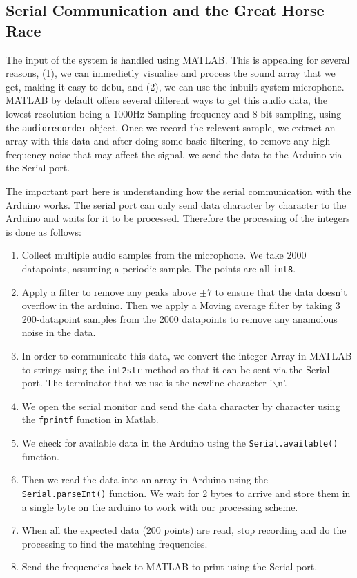 \subsection{Serial Communication and the Great Horse Race}
The input of the system is handled using MATLAB. This is appealing for several
reasons, (1), we can immedietly visualise and process the sound array that we
get, making it easy to debu, and (2), we can use the inbuilt system microphone.
MATLAB by default offers several different ways to get this audio data, the
lowest resolution being a 1000Hz Sampling frequency and 8-bit sampling, using
the \texttt{audiorecorder} object. Once we record the relevent sample, we
extract an array with this data and after doing some basic filtering, to remove
any high frequency noise that may affect the signal, we send the data to the
Arduino via the Serial port. 

The important part here is understanding how the serial communication with the
Arduino works. The serial port can only send data character by character to the
Arduino and waits for it to be processed. Therefore the processing of the
integers is done as follows: 

\begin{enumerate}
    \item Collect multiple audio samples from the microphone. We take 2000
    datapoints, assuming a periodic sample. The points are all \texttt{int8}.

    \item Apply a filter to remove any peaks above \(\pm7\) to ensure that the
    data doesn't overflow in the arduino. Then we apply a Moving average filter
    by taking 3 200-datapoint samples from the 2000 datapoints to remove any
    anamolous noise in the data.

    \item In order to communicate this data, we convert the integer Array in
    MATLAB to strings using the \texttt{int2str} method so that it can be sent
    via the Serial port. The terminator that we use is the newline character
    '$\backslash$n'.

    \item We open the serial monitor and send the data character by character
    using the \texttt{fprintf} function in Matlab.

    \item We check for available data in the Arduino using the
    \texttt{Serial.available()} function.

    \item Then we read the data into an array in Arduino using the
    \texttt{Serial.parseInt()} function. We wait for 2 bytes to arrive and store
    them in a single byte on the arduino to work with our processing scheme.
    
    \item When all the expected data (200 points) are read, stop recording and
    do the processing to find the matching frequencies. 

    \item Send the frequencies back to MATLAB to print using the Serial port. 
\end{enumerate}

